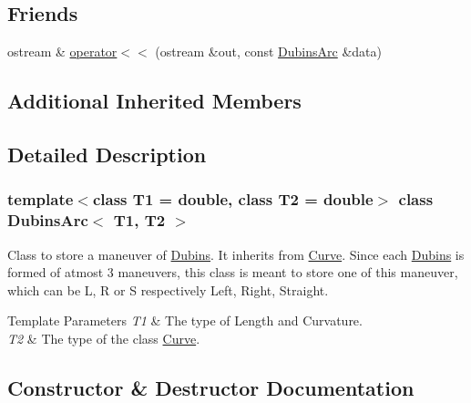 \subsection*{Friends}
\begin{DoxyCompactItemize}
\item 
ostream \& \mbox{\hyperlink{class_dubins_arc_a9fbd2f7583b614eba51fd90a9def4b51}{operator$<$$<$}} (ostream \&out, const \mbox{\hyperlink{class_dubins_arc}{Dubins\+Arc}} \&data)
\end{DoxyCompactItemize}
\subsection*{Additional Inherited Members}


\subsection{Detailed Description}
\subsubsection*{template$<$class T1 = double, class T2 = double$>$\newline
class Dubins\+Arc$<$ T1, T2 $>$}

Class to store a maneuver of \mbox{\hyperlink{class_dubins}{Dubins}}. It inherits from {\ttfamily \mbox{\hyperlink{class_curve}{Curve}}}. Since each \mbox{\hyperlink{class_dubins}{Dubins}} is formed of atmost 3 maneuvers, this class is meant to store one of this maneuver, which can be L, R or S respectively Left, Right, Straight. 


\begin{DoxyTemplParams}{Template Parameters}
{\em T1} & The type of Length and Curvature. \\
\hline
{\em T2} & The type of the class {\ttfamily \mbox{\hyperlink{class_curve}{Curve}}}. \\
\hline
\end{DoxyTemplParams}


\subsection{Constructor \& Destructor Documentation}
\mbox{\label{class_dubins_arc_ad09a4671b1b63f630d01b10ef3e48fb0}} 
